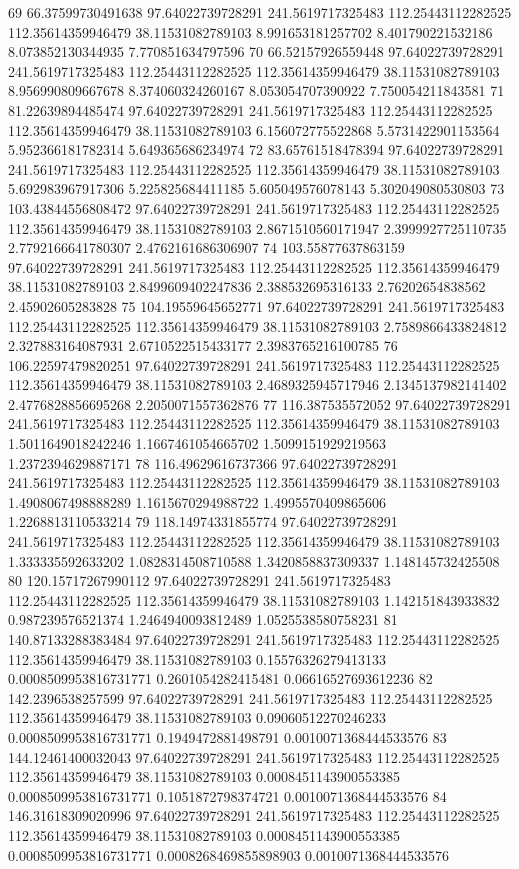 {69 66.37599730491638 97.64022739728291 241.5619717325483 112.25443112282525 112.35614359946479 38.11531082789103 8.991653181257702 8.401790221532186 8.073852130344935 7.770851634797596
70 66.52157926559448 97.64022739728291 241.5619717325483 112.25443112282525 112.35614359946479 38.11531082789103 8.956990809667678 8.374060324260167 8.053054707390922 7.750054211843581
71 81.22639894485474 97.64022739728291 241.5619717325483 112.25443112282525 112.35614359946479 38.11531082789103 6.156072775522868 5.5731422901153564 5.952366181782314 5.649365686234974
72 83.65761518478394 97.64022739728291 241.5619717325483 112.25443112282525 112.35614359946479 38.11531082789103 5.692983967917306 5.225825684411185 5.605049576078143 5.302049080530803
73 103.43844556808472 97.64022739728291 241.5619717325483 112.25443112282525 112.35614359946479 38.11531082789103 2.8671510560171947 2.3999927725110735 2.7792166641780307 2.4762161686306907
74 103.55877637863159 97.64022739728291 241.5619717325483 112.25443112282525 112.35614359946479 38.11531082789103 2.8499609402247836 2.388532695316133 2.76202654838562 2.45902605283828
75 104.19559645652771 97.64022739728291 241.5619717325483 112.25443112282525 112.35614359946479 38.11531082789103 2.7589866433824812 2.327883164087931 2.6710522515433177 2.3983765216100785
76 106.22597479820251 97.64022739728291 241.5619717325483 112.25443112282525 112.35614359946479 38.11531082789103 2.4689325945717946 2.1345137982141402 2.4776828856695268 2.2050071557362876
77 116.387535572052 97.64022739728291 241.5619717325483 112.25443112282525 112.35614359946479 38.11531082789103 1.5011649018242246 1.1667461054665702 1.5099151929219563 1.2372394629887171
78 116.49629616737366 97.64022739728291 241.5619717325483 112.25443112282525 112.35614359946479 38.11531082789103 1.4908067498888289 1.1615670294988722 1.4995570409865606 1.2268813110533214
79 118.14974331855774 97.64022739728291 241.5619717325483 112.25443112282525 112.35614359946479 38.11531082789103 1.333335592633202 1.0828314508710588 1.3420858837309337 1.148145732425508
80 120.15717267990112 97.64022739728291 241.5619717325483 112.25443112282525 112.35614359946479 38.11531082789103 1.142151843933832 0.987239576521374 1.2464940093812489 1.0525538580758231
81 140.87133288383484 97.64022739728291 241.5619717325483 112.25443112282525 112.35614359946479 38.11531082789103 0.15576326279413133 0.0008509953816731771 0.2601054282415481 0.06616527693612236
82 142.2396538257599 97.64022739728291 241.5619717325483 112.25443112282525 112.35614359946479 38.11531082789103 0.09060512270246233 0.0008509953816731771 0.1949472881498791 0.0010071368444533576
83 144.12461400032043 97.64022739728291 241.5619717325483 112.25443112282525 112.35614359946479 38.11531082789103 0.0008451143900553385 0.0008509953816731771 0.1051872798374721 0.0010071368444533576
84 146.31618309020996 97.64022739728291 241.5619717325483 112.25443112282525 112.35614359946479 38.11531082789103 0.0008451143900553385 0.0008509953816731771 0.0008268469855898903 0.0010071368444533576
}\tableexpivwaitaicode
